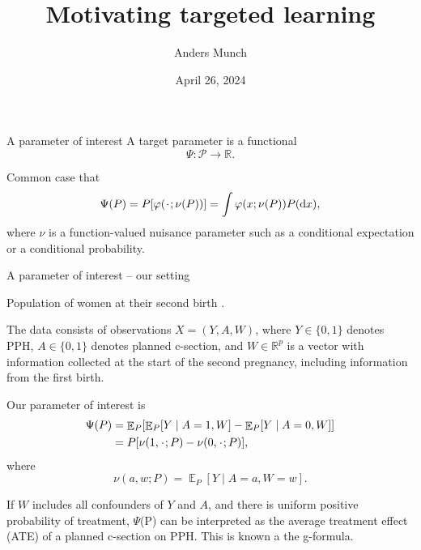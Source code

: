 \documentclass[smaller]{beamer}\usepackage{listings}
\author{Anders Munch}
\date{April 26, 2024}
\title{Motivating targeted learning}
\newcommand{\E}{{\ensuremath{\mathop{{\mathbb{E}}}}}}
\newcommand{\R}{\mathbb{R}}
\newcommand{\blank}{\makebox[1ex]{\textbf{$\cdot$}}}
\renewcommand{\phi}{\varphi}
\newcommand*\diff{\mathop{}\!\mathrm{d}}
\newcommand{\1}{\mathds{1}}
\begin{document}
\maketitle

\begin{frame}[label={sec:orga6e9c25}]{A parameter of interest}
A target parameter is a functional
\begin{equation*}
  \Psi \colon \mathcal{P} \longrightarrow \R.
\end{equation*}

\vfill

Common case that
\begin{equation*}
  \Psi(P) = P{[ \phi(\blank; \nu(P)) ]}
  = \int \phi(x; \nu(P)) P(\diff x),
\end{equation*}
where $\nu$ is a function-valued nuisance parameter such as a conditional expectation or
a conditional probability.
\end{frame}


\begin{frame}[label={sec:orgadf46f6}]{A parameter of interest -- our setting}
\small

Population of women at their second birth \citep{wikkelso2014prediction}.

\vfill

The data consists of observations \( X = (Y, A, W) \), where \( Y \in \{0,1\}\) denotes PPH,
\( A \in \{0,1\} \) denotes planned c-section, and \( W \in \R^p \) is a vector
with information collected at the start of the second pregnancy, including
information from the first birth.

\vfill

Our parameter of interest is
\begin{align*}
  \Psi(P)
  & =
    \E_P
    {\left[
    \E_P{\left[ Y \mid A=1, W  \right]}
    - \E_P{\left[ Y \mid A=0, W  \right]}
    \right]}
  \\
  & = 
    P{[\nu(1, \blank; P) - \nu(0, \blank; P)]}    ,
\end{align*}
where
\begin{equation*}
  \nu(a, w; P) = \E_P{\left[ Y \mid A=a, W=w  \right]}.
\end{equation*}

\vfill

If \color{bblue}\(W\) includes all confounders of \(Y\) and \(A\)\color{black},
and there is \color{bblue}uniform positive probability of
treatment\color{black}, \(\Psi\)(P) can be interpreted as the average treatment
effect (ATE) of a planned c-section on PPH. This is known a the g-formula.
\end{frame}
\end{document}
